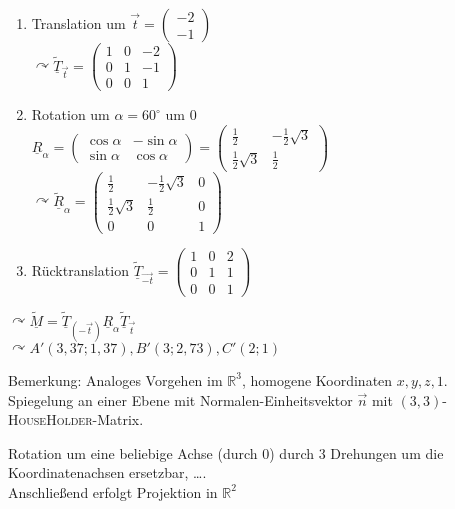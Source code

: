 \documentclass[a4paper]{scrartcl}
\begin{document}
\begin{enumerate}
\item Translation um $\vec{t} = \begin{pmatrix} -2 \\-1\end{pmatrix}$\\
$\curvearrowright \underline{\tilde{T}}_{\vec{t}} = \begin{pmatrix}
1 & 0 & -2 \\
0 & 1 & -1 \\
0 & 0 & 1
\end{pmatrix}$
\item Rotation um $\alpha = 60^\circ$ um $0$\\
$\underline{R}_\alpha =  \begin{pmatrix} \cos{\alpha} & -\sin{\alpha}\\
\sin{\alpha} & \cos{\alpha} \end{pmatrix} = \begin{pmatrix}
\frac{1}{2} & -\frac{1}{2} \sqrt{3} \\
\frac{1}{2} \sqrt{3} & \frac{1}{2} \end{pmatrix}$\\
$\curvearrowright \underline{\tilde{R}}_\alpha = \begin{pmatrix}
\frac{1}{2} & -\frac{1}{2} \sqrt{3} & 0 \\
\frac{1}{2} \sqrt{3} & \frac{1}{2} & 0 \\
0 & 0 & 1 \end{pmatrix}$
\item Rücktranslation $\underline{\tilde{T}}_{\vec{-t}} = \begin{pmatrix}
1 & 0 & 2 \\
0 & 1 & 1 \\
0 & 0 & 1
\end{pmatrix}$
\end{enumerate}
$\curvearrowright \underline{\tilde{M}} = \underline{\tilde{T}}_{(-\vec{t})} \underline{R}_{\alpha} \underline{\tilde{T}}_{\vec{t}} $\\
$\curvearrowright A'(3,37;1,37), B'(3;2,73), C'(2;1)$

Bemerkung: Analoges Vorgehen im $\mathbb{R}^3$, homogene Koordinaten $x,y,z,1.$ Spiegelung an einer Ebene mit Normalen-Einheitsvektor $\vec{n}$ mit $(3,3)$- \textsc{HouseHolder}-Matrix.

Rotation um eine beliebige Achse (durch $0$) durch $3$ Drehungen um die Koordinatenachsen ersetzbar, \dots .\\
Anschließend erfolgt Projektion in $\mathbb{R}^2$
\end{document}
